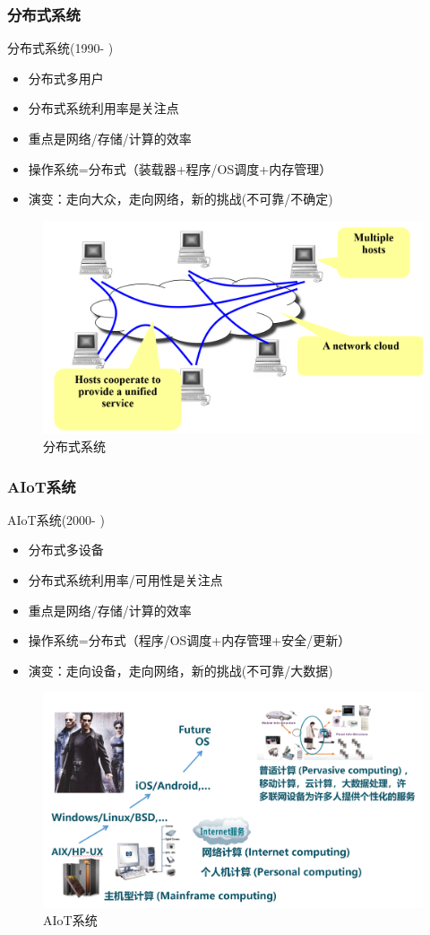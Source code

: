 \documentclass[UTF8]{ctexbeamer}
\begin{document}
\begin{frame}
	
	\frametitle{分布式系统}
	
	分布式系统(1990- )

	\begin{itemize}
		\item 分布式多用户
		\item 分布式系统利用率是关注点	
		\item 重点是网络/存储/计算的效率
		\item 操作系统=分布式（装载器+程序/OS调度+内存管理）
		\item 演变：走向大众，走向网络，新的挑战(不可靠/不确定)
	\end{itemize}
	
	\begin{figure}
		\centering
		\includegraphics[width=0.6\linewidth]{history-ds}
		\caption{分布式系统}
	\end{figure}
	
\end{frame}

\begin{frame}
	
	\frametitle{AIoT系统}
	
	AIoT系统(2000- )

	\begin{itemize}
		\item 分布式多设备
		\item 分布式系统利用率/可用性是关注点	
		\item 重点是网络/存储/计算的效率
		\item 操作系统=分布式（程序/OS调度+内存管理+安全/更新）
		\item 演变：走向设备，走向网络，新的挑战(不可靠/大数据)
	\end{itemize}
	
	\begin{figure}
		\centering
		\includegraphics[width=0.6\linewidth]{history-aiot}
		\caption{AIoT系统}
	\end{figure}
	
\end{frame}

\end{document}
